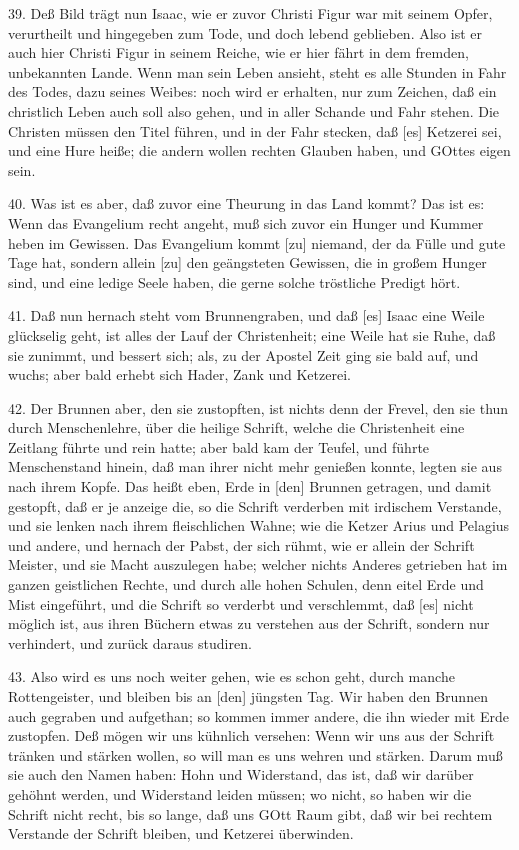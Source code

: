 39. Deß Bild trägt nun Isaac, wie er zuvor Christi Figur war mit seinem Opfer, verurtheilt und hingegeben zum Tode, und doch lebend geblieben. Also ist er auch hier Christi Figur in seinem Reiche, wie er hier fährt in dem fremden, unbekannten Lande. Wenn man sein Leben ansieht, steht es alle Stunden in Fahr des Todes, dazu seines Weibes: noch wird er erhalten, nur zum Zeichen, daß ein christlich Leben auch soll also gehen, und in aller Schande und Fahr stehen. Die Christen müssen den Titel führen, und in der Fahr stecken, daß [es] Ketzerei sei, und eine Hure heiße; die andern wollen rechten Glauben haben, und GOttes eigen sein.

40. Was ist es aber, daß zuvor eine Theurung in das Land kommt? Das ist es: Wenn das Evangelium recht angeht, muß sich zuvor ein Hunger und Kummer heben im Gewissen. Das Evangelium kommt [zu] niemand, der da Fülle und gute Tage hat, sondern allein [zu] den geängsteten Gewissen, die in großem Hunger sind, und eine ledige Seele haben, die gerne solche tröstliche Predigt hört.

41. Daß nun hernach steht vom Brunnengraben, und daß [es] Isaac eine Weile glückselig geht, ist alles der Lauf der Christenheit; eine Weile hat sie Ruhe, daß sie zunimmt, und bessert sich; als, zu der Apostel Zeit ging sie bald auf, und wuchs; aber bald erhebt sich Hader, Zank und Ketzerei.

42. Der Brunnen aber, den sie zustopften, ist nichts denn der Frevel, den sie thun durch Menschenlehre, über die heilige Schrift, welche die Christenheit eine Zeitlang führte und rein hatte; aber bald kam der Teufel, und führte Menschenstand hinein, daß man ihrer nicht mehr genießen konnte, legten sie aus nach ihrem Kopfe. Das heißt eben, Erde in [den] Brunnen getragen, und damit gestopft, daß er je anzeige die, so die Schrift verderben mit irdischem Verstande, und sie lenken nach ihrem fleischlichen Wahne; wie die Ketzer Arius und Pelagius und andere, und hernach der Pabst, der sich rühmt, wie er allein der Schrift Meister, und sie Macht auszulegen habe; welcher nichts Anderes getrieben hat im ganzen geistlichen Rechte, und durch alle hohen Schulen, denn eitel Erde und Mist eingeführt, und die Schrift so verderbt und verschlemmt, daß [es] nicht möglich ist, aus ihren Büchern etwas zu verstehen aus der Schrift, sondern nur verhindert, und zurück daraus studiren.

43. Also wird es uns noch weiter gehen, wie es schon geht, durch manche Rottengeister, und bleiben bis an [den] jüngsten Tag. Wir haben den Brunnen auch gegraben und aufgethan; so kommen immer andere, die ihn wieder mit Erde zustopfen. Deß mögen wir uns kühnlich versehen: Wenn wir uns aus der Schrift tränken und stärken wollen, so will man es uns wehren und stärken. Darum muß sie auch den Namen haben: Hohn und Widerstand, das ist, daß wir darüber gehöhnt werden, und Widerstand leiden müssen; wo nicht, so haben wir die Schrift nicht recht, bis so lange, daß uns GOtt Raum gibt, daß wir bei rechtem Verstande der Schrift bleiben, und Ketzerei überwinden.


